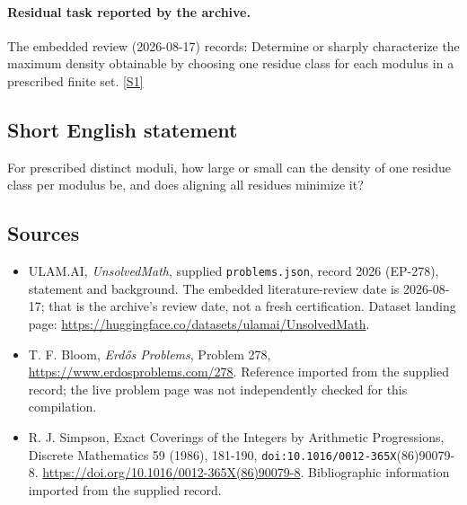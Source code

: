 \documentclass[11pt,a4paper]{article}
\newcommand{\sref}[2]{\hyperlink{source:#1:#2}{[S#2]}}
\begin{document}
\paragraph{Residual task reported by the archive.}

The embedded review (2026-08-17) records: Determine or sharply characterize the maximum density obtainable by choosing one residue class for each modulus in a prescribed finite set. \sref{2026}{1}

\subsection{Short English statement}

For prescribed distinct moduli, how large or small can the density of one residue class per modulus be, and does aligning all residues minimize it?

\subsection{Sources}

{\small

\begin{itemize}

\item[\hypertarget{source:2026:1}{S1}] ULAM.AI, \emph{UnsolvedMath}, supplied \texttt{problems.json}, record 2026 (EP-278), statement and background. The embedded literature-review date is 2026-08-17; that is the archive’s review date, not a fresh certification. Dataset landing page: \url{https://huggingface.co/datasets/ulamai/UnsolvedMath}.

\item[\hypertarget{source:2026:2}{S2}] T. F. Bloom, \emph{Erdős Problems}, Problem 278, \url{https://www.erdosproblems.com/278}. Reference imported from the supplied record; the live problem page was not independently checked for this compilation.

\item[\hypertarget{source:2026:3}{S3}] R. J. Simpson, Exact Coverings of the Integers by Arithmetic Progressions, Discrete Mathematics 59 (1986), 181-190, \nolinkurl{doi:10.1016/0012-365X}(86)90079-8. \url{https://doi.org/10.1016/0012-365X(86)90079-8}. Bibliographic information imported from the supplied record.

\end{itemize}

}

\label{end:2026}
\end{document}
